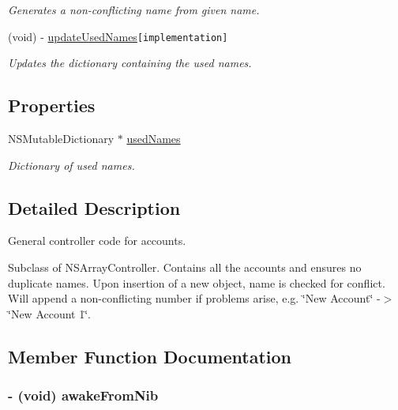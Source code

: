 \begin{CompactItemize}
\begin{CompactList}\small\item\em Generates a non-conflicting name from given name. \item\end{CompactList}\item 
(void) - \hyperlink{interface_z_x_account_controller_489f46d9731a5b0737b028ea9063e202}{updateUsedNames}{\tt  \mbox{[}implementation\mbox{]}}
\begin{CompactList}\small\item\em Updates the dictionary containing the used names. \item\end{CompactList}\end{CompactItemize}
\subsection*{Properties}
\begin{CompactItemize}
\item 
NSMutableDictionary $\ast$ \hyperlink{interface_z_x_account_controller_a7bdd570e90b4302106f265e73721a56}{usedNames}
\begin{CompactList}\small\item\em Dictionary of used names. \item\end{CompactList}\end{CompactItemize}


\subsection{Detailed Description}
General controller code for accounts. 

Subclass of NSArrayController. Contains all the accounts and ensures no duplicate names. Upon insertion of a new object, name is checked for conflict. Will append a non-conflicting number if problems arise, e.g. \char`\"{}New Account\char`\"{} -$>$ \char`\"{}New Account 1\char`\"{}. 

\subsection{Member Function Documentation}
\hypertarget{interface_z_x_account_controller_9bde4a1f4ab0fdc0b18a190f4573977a}{
\subsubsection[{awakeFromNib}]{\setlength{\rightskip}{0pt plus 5cm}- (void) awakeFromNib }}
\label{interface_z_x_account_controller_9bde4a1f4ab0fdc0b18a190f4573977a}


